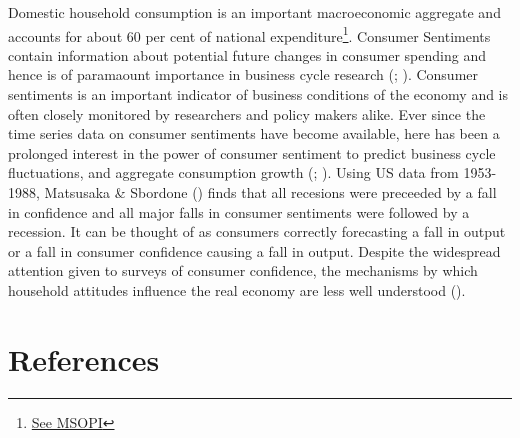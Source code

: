 \documentclass[
  a4paper,
  abstract]{scrartcl}
\begin{document}
Domestic household consumption is an important macroeconomic aggregate
and accounts for about 60 per cent of national expenditure\footnote{\href{https://pib.gov.in/PressReleasePage.aspx?PRID=2010223}{See
  MSOPI}}. Consumer Sentiments contain information about potential
future changes in consumer spending and hence is of paramaount
importance in business cycle research
(;
). Consumer sentiments is an
important indicator of business conditions of the economy and is often
closely monitored by researchers and policy makers alike. Ever since the
time series data on consumer sentiments have become available, here has
been a prolonged interest in the power of consumer sentiment to predict
business cycle fluctuations, and aggregate consumption growth
(;
). Using US
data from 1953-1988, Matsusaka \& Sbordone
() finds that all recesions
were preceeded by a fall in confidence and all major falls in consumer
sentiments were followed by a recession. It can be thought of as
consumers correctly forecasting a fall in output or a fall in consumer
confidence causing a fall in output. Despite the widespread attention
given to surveys of consumer confidence, the mechanisms by which
household attitudes influence the real economy are less well understood
().

\section*{References}\label{references}
\end{document}
